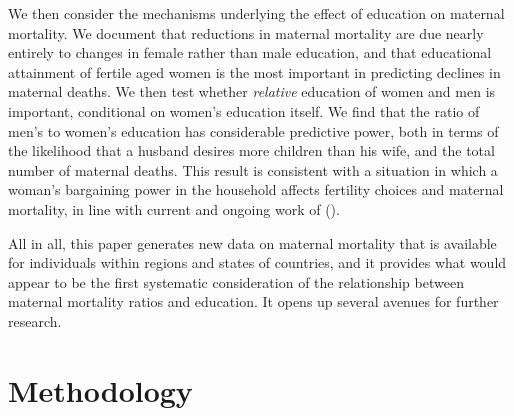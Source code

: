 \documentclass{article}[12pt,subeqn]
\begin{document}
\begin{spacing}{1.4}
We then consider the mechanisms underlying the effect of education on maternal
mortality.  We document that reductions in maternal mortality are due nearly
entirely to changes in female rather than male education, and that educational
attainment of fertile aged women is the most important in predicting declines in
maternal deaths. We then test whether \emph{relative} education of women and men
is important, conditional on women's education itself.  We find that the ratio
of men's to women's education has considerable predictive power, both in terms
of the likelihood that a husband desires more children than his wife, and the
total number of maternal deaths.  This result is consistent with a situation in
which a woman's bargaining power in the household affects fertility choices and
maternal mortality, in line with current and ongoing work of
\citeauthor{Ashrafetal2012} (\citeyear{Ashrafetal2012,Ashrafetal2014}).

All in all, this paper generates new data on maternal mortality that is available 
for individuals within regions and states of countries, and it provides what would 
appear to be the first systematic consideration of the relationship between 
maternal mortality ratios and education. It opens up several avenues for further 
research.

\section{Methodology}

\end{spacing}
\end{document}
